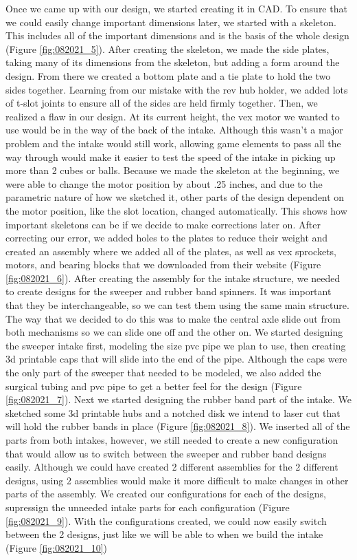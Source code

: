 Once we came up with our design, we started creating it in CAD. To ensure that we could easily change important dimensions later, we started with a skeleton. This includes all of the important dimensions and is the basis of the whole design (Figure \ref{fig:082021_5}). After creating the skeleton, we made the side plates, taking many of its dimensions from the skeleton, but adding a form around the design. From there we created a bottom plate and a tie plate to hold the two sides together. Learning from our mistake with the rev hub holder, we added lots of t-slot joints to ensure all of the sides are held firmly together. Then, we realized a flaw in our design. At its current height, the vex motor we wanted to use would be in the way of the back of the intake. Although this wasn’t a major problem and the intake would still work, allowing game elements to pass all the way through would make it easier to test the speed of the intake in picking up more than 2 cubes or balls. Because we made the skeleton at the beginning, we were able to change the motor position by about .25 inches, and due to the parametric nature of how we sketched it, other parts of the design dependent on the motor position, like the slot location, changed automatically. This shows how important skeletons can be if we decide to make corrections later on. After correcting our error, we added holes to the plates to reduce their weight and created an assembly where we added all of the plates, as well as vex sprockets, motors, and bearing blocks that we downloaded from their website (Figure \ref{fig:082021_6}).
After creating the assembly for the intake structure, we needed to create designs for the sweeper and rubber band spinners. It was important that they be interchangeable, so we can test them using the same main structure. The way that we decided to do this was to make the central axle slide out from both mechanisms so we can slide one off and the other on. We started designing the sweeper intake first, modeling the size pvc pipe we plan to use, then creating 3d printable caps that will slide into the end of the pipe. Although the caps were the only part of the sweeper that needed to be modeled, we also added the surgical tubing and pvc pipe to get a better feel for the design (Figure \ref{fig:082021_7}). Next we started designing the rubber band part of the intake. We sketched some 3d printable hubs and a notched disk we intend to laser cut that will hold the rubber bands in place (Figure \ref{fig:082021_8}). 
We inserted all of the parts from both intakes, however, we still needed to create a new configuration that would allow us to switch between the sweeper and rubber band designs easily. Although we could have created 2 different assemblies for the 2 different designs, using 2 assemblies would make it more difficult to make changes in other parts of the assembly. We created our configurations for each of the designs, supressign the unneeded intake parts for each configuration (Figure \ref{fig:082021_9}). With the configurations created, we could now easily switch between the 2 designs, just like we will be able to when we build the intake (Figure \ref{fig:082021_10})


